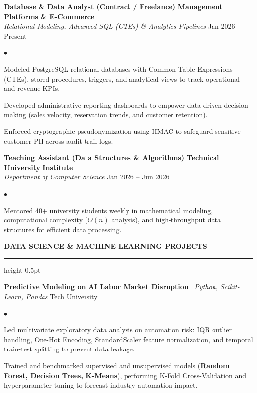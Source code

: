 \documentclass[10pt,letterpaper]{article}
\newcommand{\resumesection}[1]{%
  \vspace{2pt}%
  {\color{primary}\normalsize\bfseries\MakeUppercase{#1}}%
  \vspace{1pt}\hrule height 0.5pt\vspace{2pt}%
}
\renewenvironment{itemize}{%
  \begin{list}{\color{primary}$\bullet$}{%
    \setlength{\leftmargin}{1.1em}%
    \setlength{\itemsep}{0.5pt}%
    \setlength{\topsep}{1pt}%
    \setlength{\parsep}{0pt}%
    \setlength{\partopsep}{0pt}%
  }%
}{%
  \end{list}%
}
\begin{document}
\vspace{1.5pt}

\textbf{Database \& Data Analyst (Contract / Freelance)} \hfill \textbf{Management Platforms \& E-Commerce} \\
\textit{Relational Modeling, Advanced SQL (CTEs) \& Analytics Pipelines} \hfill Jan 2026 -- Present
\begin{itemize}
    \item Modeled PostgreSQL relational databases with Common Table Expressions (CTEs), stored procedures, triggers, and analytical views to track operational and revenue KPIs.
    \item Developed administrative reporting dashboards to empower data-driven decision making (sales velocity, reservation trends, and customer retention).
    \item Enforced cryptographic pseudonymization using HMAC to safeguard sensitive customer PII across audit trail logs.
\end{itemize}

\vspace{1.5pt}

\textbf{Teaching Assistant (Data Structures \& Algorithms)} \hfill \textbf{Technical University Institute} \\
\textit{Department of Computer Science} \hfill Jan 2026 -- Jun 2026
\begin{itemize}
    \item Mentored 40+ university students weekly in mathematical modeling, computational complexity ($O(n)$ analysis), and high-throughput data structures for efficient data processing.
\end{itemize}

\resumesection{Data Science \& Machine Learning Projects}

\textbf{Predictive Modeling on AI Labor Market Disruption} \textbar\ \textit{Python, Scikit-Learn, Pandas} \hfill Tech University
\begin{itemize}
    \item Led multivariate exploratory data analysis on automation risk: IQR outlier handling, One-Hot Encoding, StandardScaler feature normalization, and temporal train-test splitting to prevent data leakage.
    \item Trained and benchmarked supervised and unsupervised models (\textbf{Random Forest, Decision Trees, K-Means}), performing K-Fold Cross-Validation and hyperparameter tuning to forecast industry automation impact.
\end{itemize}
\end{document}
